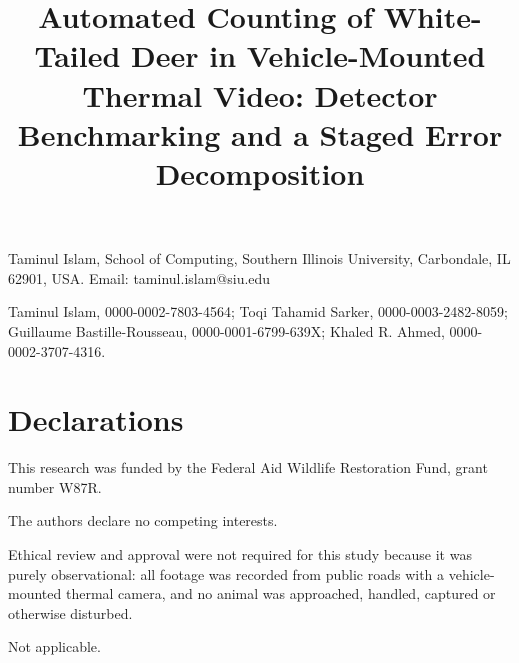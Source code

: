 \documentclass[pdflatex,sn-basic,Numbered]{sn-jnl}
\begin{document}
\title[Counting White-Tailed Deer in Vehicle-Mounted Thermal Video]{Automated Counting of White-Tailed Deer in Vehicle-Mounted Thermal Video: Detector Benchmarking and a Staged Error Decomposition}

\author*[1]{ }
\author[1]{ }
\author[2]{ }
\author[2]{ }
\author[1]{ }


\maketitle

\backmatter

Taminul Islam, School of Computing, Southern Illinois University, Carbondale, IL 62901, USA.
Email: taminul.islam@siu.edu

Taminul Islam, 0000-0002-7803-4564; Toqi Tahamid Sarker, 0000-0003-2482-8059;
Guillaume Bastille-Rousseau, 0000-0001-6799-639X; Khaled R. Ahmed, 0000-0002-3707-4316.

\section*{Declarations}

This research was funded by the Federal Aid Wildlife Restoration Fund, grant number W87R.

The authors declare no competing interests.

Ethical review and approval were not required for this study because it was purely
observational: all footage was recorded from public roads with a vehicle-mounted thermal
camera, and no animal was approached, handled, captured or otherwise disturbed.

Not applicable.
\end{document}
